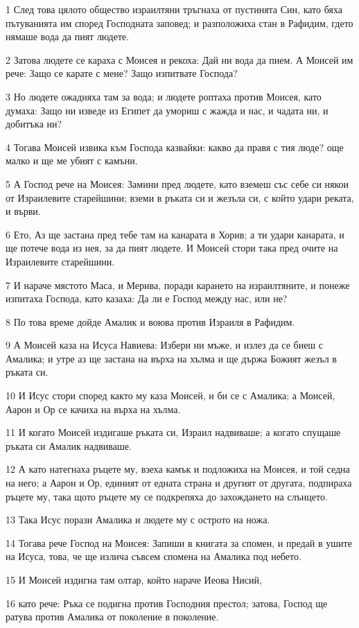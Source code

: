 \par 1 След това цялото общество израилтяни тръгнаха от пустинята Син, като бяха пътуванията им според Господната заповед; и разположиха стан в Рафидим, гдето нямаше вода да пият людете.
\par 2 Затова людете се караха с Моисея и рекоха: Дай ни вода да пием. А Моисей им рече: Защо се карате с мене? Защо изпитвате Господа?
\par 3 Но людете ожадняха там за вода; и людете роптаха против Моисея, като думаха: Защо ни изведе из Египет да умориш с жажда и нас, и чадата ни, и добитъка ни?
\par 4 Тогава Моисей извика към Господа казвайки: какво да правя с тия люде? още малко и ще ме убият с камъни.
\par 5 А Господ рече на Моисея: Замини пред людете, като вземеш със себе си някои от Израилевите старейшини; вземи в ръката си и жезъла си, с който удари реката, и върви.
\par 6 Ето, Аз ще застана пред тебе там на канарата в Хорив; а ти удари канарата, и ще потече вода из нея, за да пият людете. И Моисей стори така пред очите на Израилевите старейшини.
\par 7 И нараче мястото Маса, и Мерива, поради карането на израилтяните, и понеже изпитаха Господа, като казаха: Да ли е Господ между нас, или не?
\par 8 По това време дойде Амалик и воюва против Израиля в Рафидим.
\par 9 А Моисей каза на Исуса Навиева: Избери ни мъже, и излез да се биеш с Амалика; и утре аз ще застана на върха на хълма и ще държа Божият жезъл в ръката си.
\par 10 И Исус стори според както му каза Моисей, и би се с Амалика; а Моисей, Аарон и Ор се качиха на върха на хълма.
\par 11 И когато Моисей издигаше ръката си, Израил надвиваше; а когато спущаше ръката си Амалик надвиваше.
\par 12 А като натегнаха ръцете му, взеха камък и подложиха на Моисея, и той седна на него; а Аарон и Ор, единият от едната страна и другият от другата, подпираха ръцете му, така щото ръцете му се подкрепяха до захождането на слънцето.
\par 13 Така Исус порази Амалика и людете му с острото на ножа.
\par 14 Тогава рече Господ на Моисея: Запиши в книгата за спомен, и предай в ушите на Исуса, това, че ще излича съвсем спомена на Амалика под небето.
\par 15 И Моисей издигна там олтар, който нараче Иеова Нисий,
\par 16 като рече: Ръка се подигна против Господния престол; затова, Господ ще ратува против Амалика от поколение в поколение.

